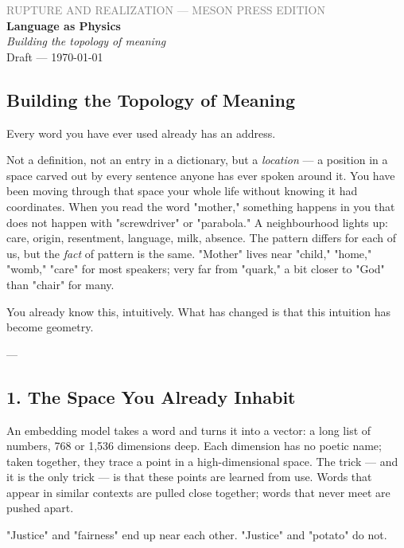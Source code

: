\documentclass[12pt,a4paper]{article}
\begin{document}
\begin{center}
{\sffamily\small\textcolor{gray}{RUPTURE AND REALIZATION — MESON PRESS EDITION}}\\[0.5em]
{\LARGE\bfseries Language as Physics}\\[0.3em]
{\large\itshape Building the topology of meaning}\\[1em]
{\sffamily\small Draft — \today}
\end{center}

\bigskip



\subsection{Building the Topology of Meaning}

Every word you have ever used already has an address.

Not a definition, not an entry in a dictionary, but a \textit{location} --- a position in a space carved out by every sentence anyone has ever spoken around it. You have been moving through that space your whole life without knowing it had coordinates. When you read the word "mother," something happens in you that does not happen with "screwdriver" or "parabola." A neighbourhood lights up: care, origin, resentment, language, milk, absence. The pattern differs for each of us, but the \textit{fact} of pattern is the same. "Mother" lives near "child," "home," "womb," "care" for most speakers; very far from "quark," a bit closer to "God" than "chair" for many.

You already know this, intuitively. What has changed is that this intuition has become geometry.

---

\subsection{1. The Space You Already Inhabit}

An embedding model takes a word and turns it into a vector: a long list of numbers, 768 or 1,536 dimensions deep. Each dimension has no poetic name; taken together, they trace a point in a high-dimensional space. The trick --- and it is the only trick --- is that these points are learned from use. Words that appear in similar contexts are pulled close together; words that never meet are pushed apart.

"Justice" and "fairness" end up near each other. "Justice" and "potato" do not.
\end{document}
